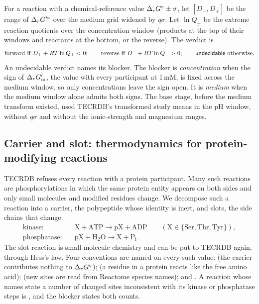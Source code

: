 For a reaction with a chemical-reference value $\Delta_r G^\circ\pm\sigma$, let $[D_-,D_+]$ be the range of $\Delta_r G'^\circ$ over the medium grid widened by $q\sigma$.
Let $\ln Q_\pm$ be the extreme reaction quotients over the concentration window (products at the top of their windows and reactants at the bottom, or the reverse).
The verdict is
\begin{equation}
  \text{forward if } D_+ + RT\ln Q_+ < 0;\qquad
  \text{reverse if } D_- + RT\ln Q_- > 0;\qquad
  \text{\textsf{undecidable} otherwise.}
\end{equation}
An undecidable verdict names its blocker.
The blocker is \emph{concentration} when the sign of $\Delta_r G'_{\mathrm{m}}$, the value with every participant at 1\,mM, is fixed across the medium window, so only concentrations leave the sign open.
It is \emph{medium} when the medium window alone admits both signs.
The base stage, before the medium transform existed, used TECRDB's transformed study means in the pH window, without $q\sigma$ and without the ionic-strength and magnesium ranges.

\subsection{Carrier and slot: thermodynamics for protein-modifying reactions}
\label{sec:slot}

TECRDB refuses every reaction with a protein participant.
Many such reactions are phosphorylations in which the same protein entity appears on both sides and only small molecules and modified residues change.
We decompose such a reaction into a carrier, the polypeptide whose identity is inert, and slots, the side chains that change:
\begin{align}
  \text{kinase:}\quad & \mathrm{X}+\mathrm{ATP}\to\mathrm{pX}+\mathrm{ADP}\qquad(\mathrm X\in\{\mathrm{Ser},\mathrm{Thr},\mathrm{Tyr}\}),\\
  \text{phosphatase:}\quad & \mathrm{pX}+\mathrm{H_2O}\to\mathrm X+\mathrm{P_i}.
\end{align}
The slot reaction is small-molecule chemistry and can be put to TECRDB again, through Hess's law.
Four conventions are named on every such value:
 (the carrier contributes nothing to $\Delta_r G^\circ$);
 (a residue in a protein reacts like the free amino acid);
 (new sites are read from Reactome species names); and
.
A reaction whose names state a number of changed sites inconsistent with its kinase or phosphatase steps is , and the blocker states both counts.

